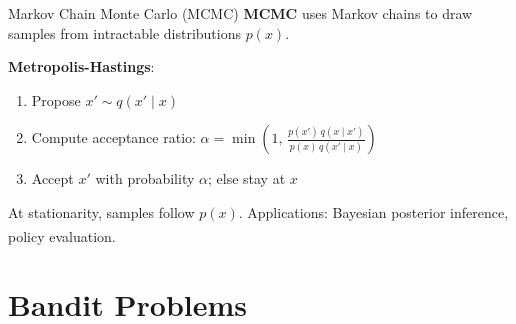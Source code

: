 \begin{v3topic}{Markov Chain Monte Carlo (MCMC)}
        \textbf{MCMC} uses Markov chains to draw samples from intractable
        distributions $p(x)$.

        \textbf{Metropolis-Hastings}:
        \begin{enumerate}
            \item Propose $x' \sim q(x' \mid x)$
            \item Compute acceptance ratio:
                  $\alpha = \min\!\left(1,\,
                  \frac{p(x')\,q(x \mid x')}{p(x)\,q(x' \mid x)}\right)$
            \item Accept $x'$ with probability $\alpha$; else stay at $x$
        \end{enumerate}
        At stationarity, samples follow $p(x)$.
        Applications: Bayesian posterior inference, policy
        evaluation.\textsuperscript{\cite[][p.~160]{barberBayesianReasoningMachine2012}}

\end{v3topic}


    \section{Bandit Problems}


